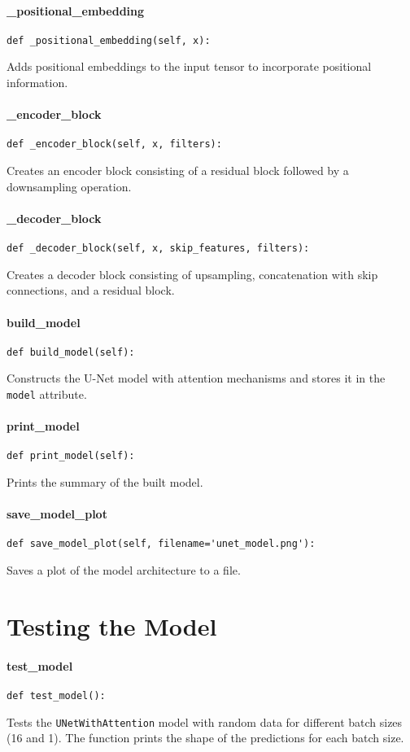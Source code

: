 \documentclass{article}
\begin{document}
\paragraph{_positional_embedding}
\begin{verbatim}
def _positional_embedding(self, x):
\end{verbatim}
Adds positional embeddings to the input tensor to incorporate positional information.

\paragraph{_encoder_block}
\begin{verbatim}
def _encoder_block(self, x, filters):
\end{verbatim}
Creates an encoder block consisting of a residual block followed by a downsampling operation.

\paragraph{_decoder_block}
\begin{verbatim}
def _decoder_block(self, x, skip_features, filters):
\end{verbatim}
Creates a decoder block consisting of upsampling, concatenation with skip connections, and a residual block.

\paragraph{build_model}
\begin{verbatim}
def build_model(self):
\end{verbatim}
Constructs the U-Net model with attention mechanisms and stores it in the \texttt{model} attribute.

\paragraph{print_model}
\begin{verbatim}
def print_model(self):
\end{verbatim}
Prints the summary of the built model.

\paragraph{save_model_plot}
\begin{verbatim}
def save_model_plot(self, filename='unet_model.png'):
\end{verbatim}
Saves a plot of the model architecture to a file.

\section{Testing the Model}

\paragraph{test_model}
\begin{verbatim}
def test_model():
\end{verbatim}
Tests the \texttt{UNetWithAttention} model with random data for different batch sizes (16 and 1). The function prints the shape of the predictions for each batch size.
\end{document}
